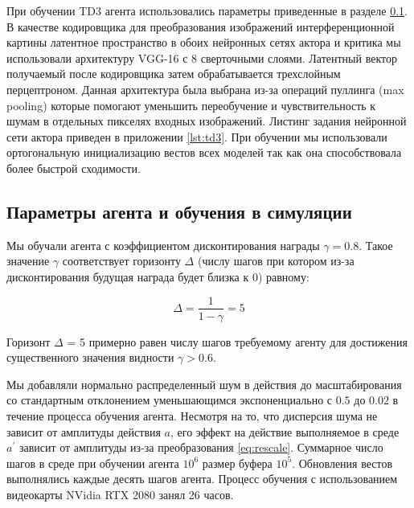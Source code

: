 При обучении TD3 агента использовались параметры приведенные в разделе \ref{sec:ch2/sec4/subsec4}. В качестве кодировщика для преобразования изображений интерференционной картины латентное пространство в обоих нейронных сетях актора и критика мы использовали архитектуру VGG-16 \cite{simonyan2014very} с 8 сверточными слоями. Латентный вектор получаемый после кодировщика затем обрабатывается трехслойным перцептроном. Данная архитектура была выбрана из-за операций пуллинга (max pooling) которые помогают уменьшить переобучение и чувствительность к шумам в отдельных пикселях входных изображений. Листинг задания нейронной сети актора приведен в приложении \ref{lst:td3}. При обучении мы использовали ортогональную инициализацию вестов всех моделей так как она способствовала более быстрой сходимости.

\subsection{Параметры агента и обучения в симуляции}\label{sec:ch2/sec4/subsec4}

Мы обучали агента с коэффициентом дисконтирования награды $\gamma = 0.8$. Такое значение $\gamma$ соответствует горизонту $\Delta$ (числу шагов при котором из-за дисконтирования будущая награда будет близка к $0$) равному: 

\begin{equation}
    \Delta = \frac{1}{1 - \gamma} = 5
\end{equation}

Горизонт $\Delta$ = 5 примерно равен числу шагов требуемому агенту для достижения существенного значения видности $\gamma > 0.6$. 

Мы добавляли нормально распределенный шум в действия до масштабирования со стандартным отклонением уменьшающимся экспоненциально с $0.5$ до $0.02$ в течение процесса обучения агента. Несмотря на то, что дисперсия шума не зависит от амплитуды действия $a$, его эффект на действие выполняемое в среде $a^{\prime}$ зависит от амплитуды из-за преобразования \eqref{eq:rescale}. Суммарное число шагов в среде при обучении агента $10^6$ размер буфера $10^5$. Обновления вестов выполнялись каждые десять шагов агента. Процесс обучения с использованием видеокарты NVidia RTX 2080 занял 26 часов. 

